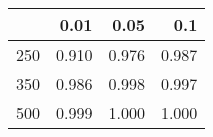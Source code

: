 % 
\begin{tabular}{rrrr}
  \hline
 & 0.01 & 0.05 & 0.1 \\ 
  \hline
250 & 0.910 & 0.976 & 0.987 \\ 
  350 & 0.986 & 0.998 & 0.997 \\ 
  500 & 0.999 & 1.000 & 1.000 \\ 
   \hline
\end{tabular}
